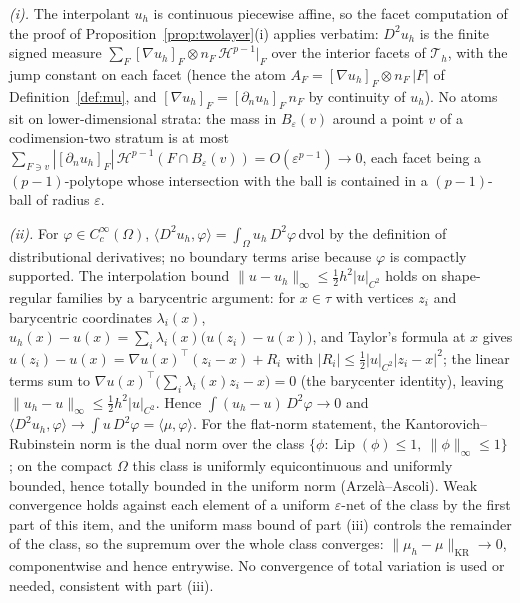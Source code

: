 \documentclass[11pt,a4paper]{article}
\theoremstyle{plain}
\theoremstyle{definition}
\theoremstyle{remark}
\newcommand{\HH}{\mathcal{H}}
\newcommand{\Lip}{\operatorname{Lip}}
\newcommand{\dvol}{\,\mathrm{dvol}}
\DeclareMathOperator{\KR}{KR}
\begin{document}
\emph{(i).} The interpolant $u_h$ is continuous piecewise affine, so
the facet computation of the proof of
Proposition~\ref{prop:twolayer}(i) applies verbatim: $D^{2}u_h$ is
the finite signed measure $\sum_{F} [\nabla u_h]_F \otimes n_F\,
\HH^{p-1}|_F$ over the interior facets of $\mathcal{T}_h$, with
the jump constant on each facet (hence the atom $A_F = [\nabla
u_h]_F \otimes n_F\,|F|$ of Definition~\ref{def:mu}, and $[\nabla
u_h]_F = [\partial_{n}u_h]_F\,n_F$ by continuity of $u_h$). No atoms
sit on lower-dimensional strata: the mass in $B_\varepsilon(v)$
around a point $v$ of a codimension-two stratum is at most
$\sum_{F \ni v} |[\partial_n u_h]_F|\,\HH^{p-1}(F \cap
B_\varepsilon(v)) = O(\varepsilon^{p-1}) \to 0$, each facet being a
$(p-1)$-polytope whose intersection with the ball is contained in a
$(p-1)$-ball of radius $\varepsilon$.

\emph{(ii).} For $\varphi \in C_c^\infty(\Omega)$,
$\langle D^{2}u_h, \varphi\rangle = \int_\Omega u_h\, D^{2}\varphi
\dvol$ by the definition of distributional derivatives; no boundary
terms arise because $\varphi$ is compactly supported. The
interpolation bound $\|u - u_h\|_\infty \le \tfrac12 h^{2}
|u|_{C^{2}}$ holds on shape-regular families by a barycentric
argument: for $x \in \tau$ with vertices $z_i$ and barycentric
coordinates $\lambda_i(x)$, $u_h(x) - u(x) = \sum_i
\lambda_i(x)\bigl(u(z_i) - u(x)\bigr)$, and Taylor's formula at $x$
gives $u(z_i) - u(x) = \nabla u(x)^{\top}(z_i - x) + R_i$ with
$|R_i| \le \tfrac12 |u|_{C^{2}} |z_i - x|^{2}$; the linear terms sum
to $\nabla u(x)^{\top}\bigl(\sum_i \lambda_i(x) z_i - x\bigr) = 0$
(the barycenter identity), leaving $\|u_h - u\|_\infty \le
\tfrac12 h^{2}|u|_{C^{2}}$. Hence $\int (u_h - u)\,D^{2}\varphi \to
0$ and $\langle D^{2}u_h,\varphi\rangle \to \int u\,D^{2}\varphi =
\langle \mu, \varphi\rangle$. For the flat-norm statement, the
Kantorovich--Rubinstein norm is the dual norm over the class
$\{\phi : \Lip(\phi) \le 1,\ \|\phi\|_\infty \le 1\}$
\citep{villani2009}; on the compact $\Omega$ this class is uniformly
equicontinuous and uniformly bounded, hence totally bounded in the
uniform norm (Arzel\`a--Ascoli). Weak convergence holds against each
element of a uniform $\varepsilon$-net of the class by the first
part of this item, and the uniform mass bound of part (iii)
controls the remainder of the class, so the supremum over the whole
class converges: $\|\mu_h - \mu\|_{\KR} \to 0$, componentwise and
hence entrywise. No convergence of total variation is used or
needed, consistent with part (iii).
\end{document}
